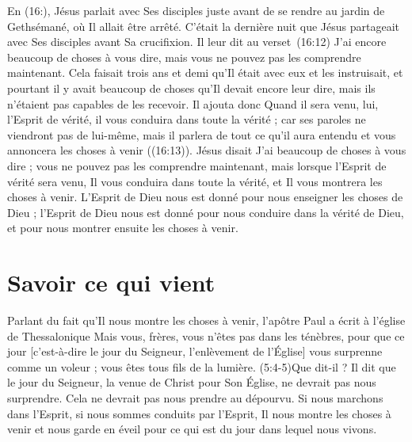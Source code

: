 En (16:), Jésus parlait avec Ses disciples juste avant
 de se rendre au jardin de Gethsémané, où Il allait être arrêté.
 C'était la dernière nuit que Jésus partageait avec Ses disciples
 avant Sa crucifixion.
 Il leur dit au verset~(16:12)\frcolon{}
 \Og J'ai encore beaucoup de choses à vous dire,
 mais vous ne pouvez pas les comprendre maintenant. \Fg{}
 Cela faisait trois ans et demi qu'Il était avec eux et les instruisait,
 et pourtant il y avait beaucoup de choses qu'Il devait encore
 leur dire, mais ils n'étaient pas capables de les recevoir.
 Il ajouta donc\frcolon{} \Og Quand il sera venu, lui, l'Esprit de vérité,
 il vous conduira dans toute la vérité ; car ses paroles ne viendront pas
 de lui-même, mais il parlera de tout ce qu'il aura entendu et vous annoncera
 les choses à venir \Fg{} ((16:13)).
 Jésus disait\frcolon{} \Og J'ai beaucoup de choses à vous dire ; vous ne pouvez pas
 les comprendre maintenant, mais lorsque l'Esprit de vérité sera venu,
 Il vous conduira dans toute la vérité, et Il vous montrera les choses
 à venir. \Fg{}
 L'Esprit de Dieu nous est donné pour nous enseigner les choses de Dieu ;
 l'Esprit de Dieu nous est donné pour nous conduire dans la vérité de Dieu,
 et pour nous montrer ensuite les choses à venir.


\section{Savoir ce qui vient}

Parlant du fait qu'Il nous montre les choses à venir,
 l'apôtre Paul a écrit à l'église de Thessalonique\frcolon{}
 \Og Mais vous, frères, vous n'êtes pas dans les ténèbres,
 pour que ce jour [c'est-à-dire le jour du Seigneur,
 l'enlèvement de l'Église] vous surprenne comme un voleur ;
 vous êtes tous fils de la lumière. \Fg{}
 (5:4-5)Que dit-il ?
 Il dit que le jour du Seigneur, la venue de Christ
 pour Son Église, ne devrait pas nous surprendre.
 Cela ne devrait pas nous prendre au dépourvu. Si nous marchons dans l'Esprit,
 si nous sommes conduits par l'Esprit, Il nous montre les choses à venir
 et nous garde en éveil pour ce qui est du jour dans lequel nous vivons.

